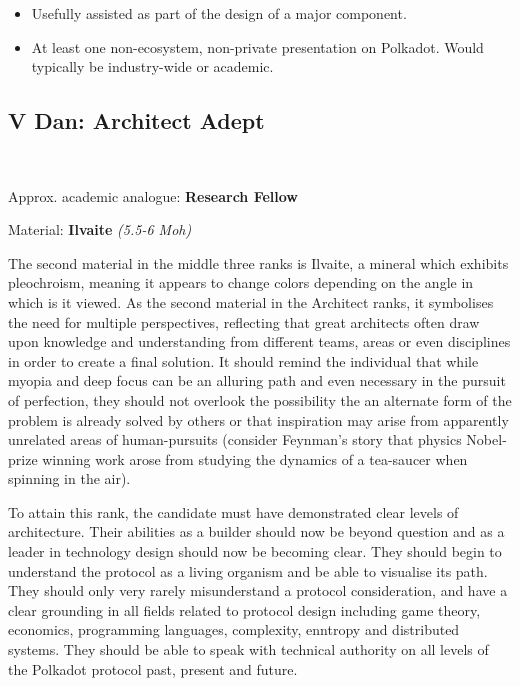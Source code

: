 \documentclass[9pt,oneside]{amsart}
\begin{document}
\begin{itemize}
\item Usefully assisted as part of the design of a major component.
\item At least one non-ecosystem, non-private presentation on Polkadot. Would typically be industry-wide or academic.
\end{itemize}

\subsection{V Dan: Architect Adept}\label{v-dan-architect-adept}~\\


Approx. academic analogue: \textbf{Research Fellow}

Material: \textbf{Ilvaite} \emph{(5.5-6 Moh)}

The second material in the middle three ranks is Ilvaite, a mineral which exhibits pleochroism, meaning it appears to change colors depending on the angle in which is it viewed. As the second material in the Architect ranks, it symbolises the need for multiple perspectives, reflecting that great architects often draw upon knowledge and understanding from different teams, areas or even disciplines in order to create a final solution. It should remind the individual that while myopia and deep focus can be an alluring path and even necessary in the pursuit of perfection, they should not overlook the possibility the an alternate form of the problem is already solved by others or that inspiration may arise from apparently unrelated areas of human-pursuits (consider Feynman's story that physics Nobel-prize winning work arose from studying the dynamics of a tea-saucer when spinning in the air).

To attain this rank, the candidate must have demonstrated clear levels of architecture. Their abilities as a builder should now be beyond question and as a leader in technology design should now be becoming clear. They should begin to understand the protocol as a living organism and be able to visualise its path. They should only very rarely misunderstand a protocol consideration, and have a clear grounding in all fields related to protocol design including game theory, economics, programming languages, complexity, enntropy and distributed systems. They should be able to speak with technical authority on all levels of the Polkadot protocol past, present and future.
\end{document}
